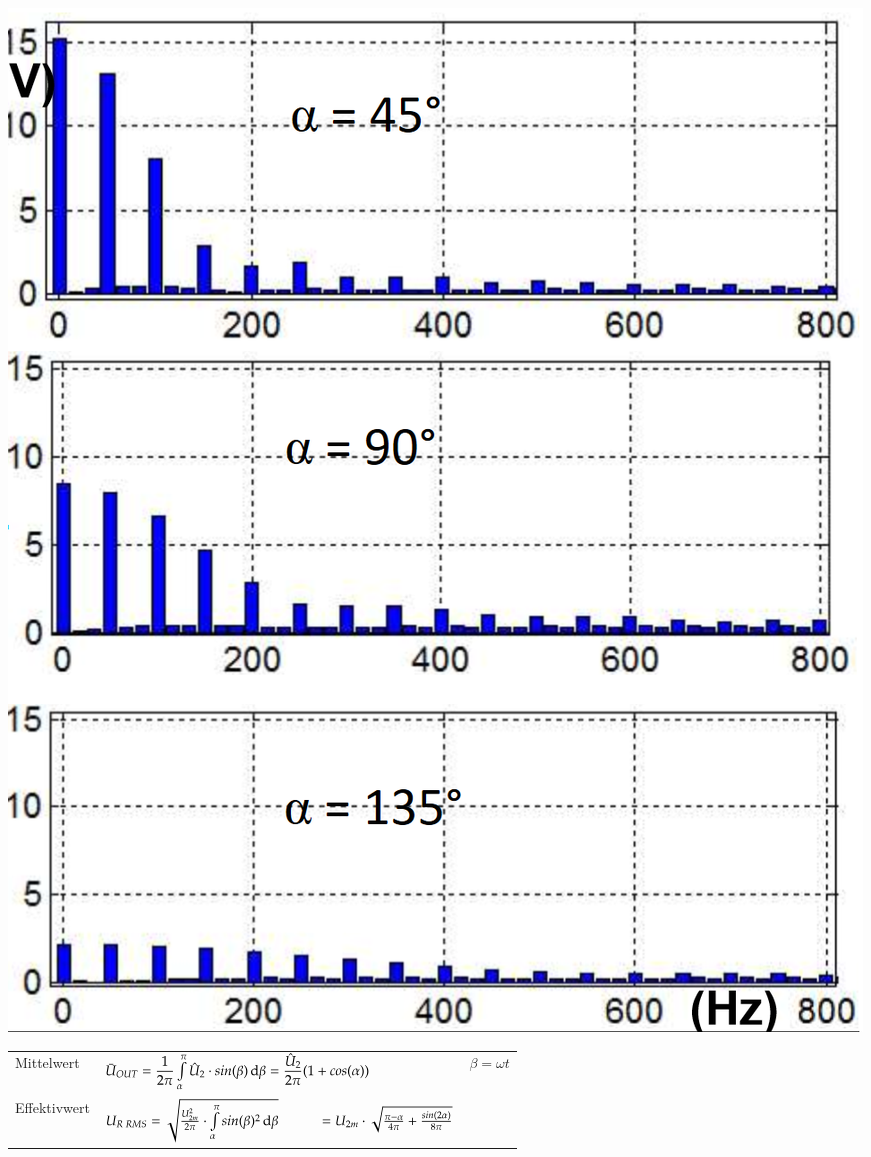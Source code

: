 \begin{minipage}{0.25\linewidth}
    \includegraphics[width=0.8\linewidth]{images/M1COW} 
\end{minipage}
\newline
\vspace{-0.8cm}
\begin{longtable}{ p{}  p{}  p{} } %
    Mittelwert&
    $ \bar{U}_{OUT} = \dfrac{1}{2\pi} \int\limits_{\alpha}^{\pi}\hat{U}_2\cdot sin(\beta) \mathop{}\!\mathrm{d} \beta =\dfrac{\hat{U}_2}{2\pi}(1+cos(\alpha)) $&
    $ \beta = \omega t $
    \\ 
    
    Effektivwert&
    $ U_{R\; RMS}= \sqrt{\frac{U_{2m}^2}{2\pi}\cdot \int\limits_{\alpha}^{\pi} sin(\beta)^2 \diff \beta} \newline
    \hspace*{1cm}= U_{2m}\cdot \sqrt{\frac{\pi - \alpha}{4 \pi}+ \frac{sin(2\alpha)}{8\pi}}$&
    \\
\end{longtable}
\vspace{-1.2cm}


